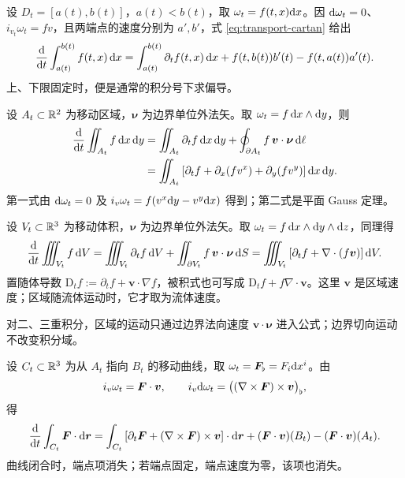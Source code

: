 \begin{example}
    设 $D_t=[a(t),b(t)]$，$a(t)<b(t)$，取 $\omega_t=f(t,x)\dd x$。因 $\dd\omega_t=0$、$i_{v_t}\omega_t=fv$，且两端点的速度分别为 $a',b'$，式 \eqref{eq:transport-cartan} 给出
    \[
        \dv{t}\int_{a(t)}^{b(t)}f(t,x)\,\dd x
        =\int_{a(t)}^{b(t)}\partial_t f(t,x)\,\dd x+f(t,b(t))b'(t)-f(t,a(t))a'(t).
    \]
    上、下限固定时，便是通常的积分号下求偏导。
\end{example}

\begin{example}[二重积分]
    设 $A_t\subset\mathbb{R}^2$ 为移动区域，$\bm\nu$ 为边界单位外法矢。取 $\omega_t=f\,\dd x\wedge\dd y$，则
    \begin{align*}
        \dv{t}\iint_{A_t}f\,\dd x\,\dd y
        &=\iint_{A_t}\partial_t f\,\dd x\,\dd y
          +\oint_{\partial A_t}f\,\bm v\cdot\bm\nu\,\dd\ell\\
        &=\iint_{A_t}\left[\partial_t f+\partial_x(fv^x)+\partial_y(fv^y)\right]\dd x\,\dd y.
    \end{align*}
    第一式由 $\dd\omega_t=0$ 及 $i_v\omega_t=f(v^x\dd y-v^y\dd x)$ 得到；第二式是平面 Gauss 定理。
\end{example}

\begin{example}
    设 $V_t\subset\mathbb{R}^3$ 为移动体积，$\bm\nu$ 为边界单位外法矢。取 $\omega_t=f\,\dd x\wedge\dd y\wedge\dd z$，同理得
    \[
        \dv{t}\iiint_{V_t}f\,\dd V
        =\iiint_{V_t}\partial_t f\,\dd V
          +\iint_{\partial V_t}f\,\bm v\cdot\bm\nu\,\dd S=\iiint_{V_t}\left[\partial_t f+\nabla\cdot(f\bm v)\right]\dd V.
    \]
    置随体导数 $\mathrm D_t f:=\partial_t f+\bm v\cdot\nabla f$，被积式也可写成 $\mathrm D_t f+f\nabla\cdot\bm v$。这里 $\bm v$ 是区域速度；区域随流体运动时，它才取为流体速度。
\end{example}

对二、三重积分，区域的运动只通过边界法向速度 $\bm v\cdot\bm\nu$ 进入公式；边界切向运动不改变积分域。

\begin{example}[矢量场的线积分]
    设 $C_t\subset\mathbb{R}^3$ 为从 $A_t$ 指向 $B_t$ 的移动曲线，取 $\omega_t=\bm F_\flat=F_i\dd x^i$。由
    \[i_v\omega_t=\bm F\cdot\bm v,\qquad
        i_v\dd\omega_t=\bigl((\nabla\times\bm F)\times\bm v\bigr)_\flat,\]
    得
    \[
        \dv{t}\int_{C_t}\bm F\cdot\dd\bm r
        =\int_{C_t}\left[\partial_t\bm F+(\nabla\times\bm F)\times\bm v\right]\cdot\dd\bm r+(\bm F\cdot\bm v)(B_t)-(\bm F\cdot\bm v)(A_t).
    \]
    曲线闭合时，端点项消失；若端点固定，端点速度为零，该项也消失。
\end{example}

